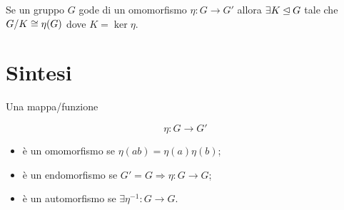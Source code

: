 \begin{corollario}
	\label{crl:Omomorfismi_fondamentale_2}	Se un gruppo $G$ gode di un omomorfismo $\eta: G \longrightarrow G'$ allora $\exists K \unlhd G$ tale che $G/K \cong \eta(G)$ dove $K = \ker \eta$.
\end{corollario}

\section{Sintesi}

Una mappa/funzione

\begin{equation}
	\eta: G \longrightarrow G'
\end{equation}

\begin{itemize}
	\item è un omomorfismo se $\eta(ab) = \eta(a)\eta(b)$;
	\item è un endomorfismo se $G' = G \Longrightarrow \eta : G \longrightarrow G$;
	\item è un automorfismo se $\exists \eta^{-1}: G \longrightarrow G$. 
\end{itemize}